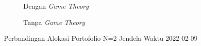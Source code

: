 % 
% 
% 
% 

% 
% 
% 
% 

\begin{figure}[!htbp]\centering\begin{subfigure}[b]{0.48\textwidth}\centering


\caption{Dengan \textit{Game Theory}}\end{subfigure}\hfill\begin{subfigure}[b]{0.48\textwidth}\centering


\caption{Tanpa \textit{Game Theory}}\end{subfigure}\caption{Perbandingan Alokasi Portofolio N=2 Jendela Waktu 2022-02-09}\label{fig:window_2022_02_09}\end{figure}

